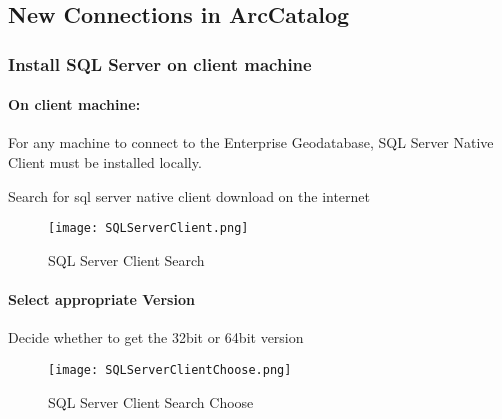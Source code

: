 \documentclass[class=book , crop=false, titlepage, twoside, multi={itemize, figure, verbatim}, float=false]{standalone}
\title{}  %
\begin{document}
%
%
\ifstandalone
%
\pagestyle{empty} %
%
\frontmatter %
%
\maketitle %
%
\clearpage
%
\tableofcontents %
%
\clearpage
%
\mainmatter %
%
\pagestyle{fancy} %
%
\fi
%
%
%
%
\subsection{New Connections in ArcCatalog}
\medskip
\subsubsection[Install SQL Server on client machine]{\Large Install SQL Server on client machine}
\paragraph*{On client machine:\texorpdfstring{\\}{}}

For any machine to connect to the Enterprise Geodatabase, SQL Server Native Client must be installed locally.
\vspace{.15in}

\noindent Search for sql server native client download on the internet
\begin{figure}[h!]
\centering
    \texttt{[image: SQLServerClient.png]}
\caption{SQL Server Client Search}
\end{figure}
\clearpage
%
%
%
\paragraph*{Select appropriate Version\texorpdfstring{\\}{}}
\noindent Decide whether to get the 32bit or 64bit version
\vspace{.25in}

\begin{figure}[h!]
\centering
    \texttt{[image: SQLServerClientChoose.png]}
\caption{SQL Server Client Search Choose}
\end{figure}
\end{document}
